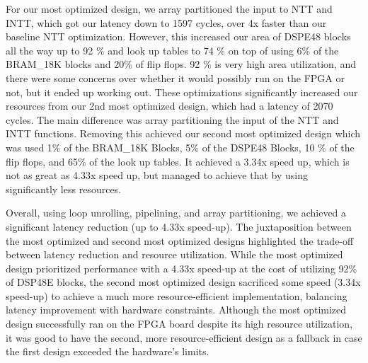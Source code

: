   For our most optimized design, we array partitioned the input to NTT and INTT, which got our latency down to 1597 cycles,
over 4x faster than our baseline NTT optimization. However, this increased our area of DSPE48 blocks all the way up to 92 \% 
and look up tables to 74 \% on top of using 6\% of the BRAM\_18K blocks and 20\% of flip flops. 92 \% is very high area 
utilization, and there were some concerns over whether it would possibly run on the FPGA or not, but it ended up working out. These
optimizations significantly increased our resources from our 2nd most optimized design, which had a latency of 2070 cycles. The
main difference was array partitioning the input of the NTT and INTT functions. Removing this achieved our second most optimized 
design which was used 1\% of the BRAM\_18K Blocks, 5\% of the DSPE48 Blocks, 10 \% of the flip flops, and  65\% of the look up tables.
It achieved a 3.34x speed up, which is not as great as 4.33x speed up, but managed to achieve that by using significantly less resources.

  Overall, using loop unrolling, pipelining, and array partitioning, we achieved a significant latency reduction (up to 4.33x speed-up).
The juxtaposition between the most optimized and second most optimized designs highlighted the trade-off between latency reduction and
resource utilization. While the most optimized design prioritized performance with a 4.33x speed-up at the cost of utilizing 92\% of DSP48E
blocks, the second most optimized design sacrificed some speed (3.34x speed-up) to achieve a much more resource-efficient implementation, 
balancing latency improvement with hardware constraints. Although the most optimized design successfully ran on the FPGA board despite its 
high resource utilization, it was good to have the second, more resource-efficient design as a fallback in case the first design exceeded 
the hardware's limits.












